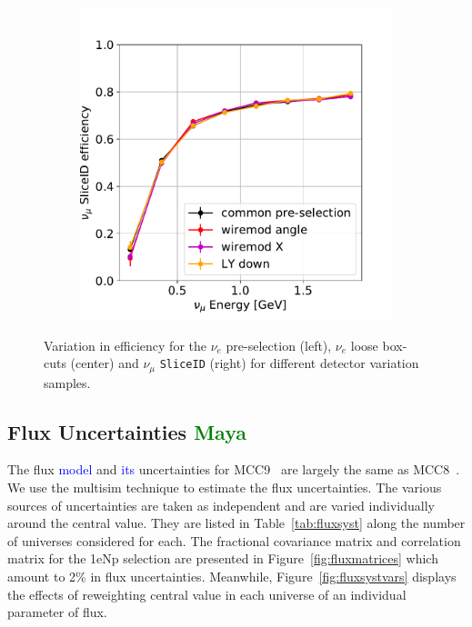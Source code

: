 \documentclass[a4paper]{article}
\begin{document}
\begin{figure}[H]
\begin{center}
\begin{subfigure}[b]{0.3\textwidth}
    \end{subfigure}
    \begin{subfigure}[b]{0.3\textwidth}
    \centering
    \includegraphics[width=1.00\textwidth]{detsys/nu_e01162020_numu_slice_eff.pdf}
    \end{subfigure}
\caption{\label{fig:detsys:dedx:eLEElow}Variation in efficiency for the $\nu_e$ pre-selection (left), $\nu_e$ loose box-cuts (center) and $\nu_{\mu}$ \texttt{SliceID} (right) for different detector variation samples.}
\end{center}
\end{figure}

\subsection{Flux Uncertainties \textcolor{green}{Maya}}
The flux \textcolor{blue}{model} and \textcolor{blue}{its} uncertainties for MCC9~\cite{bib:fluxmcc9,bib:fluxtechnote} are largely the same as MCC8~\cite{bib:fluxtechnote}. We use the multisim technique to estimate the flux uncertainties. The various sources of uncertainties are taken as independent and are varied individually around the central value. They are listed in Table~\ref{tab:fluxsyst} along the number of universes considered for each. The fractional covariance matrix and correlation matrix for the 1eNp selection are presented in Figure~\ref{fig:fluxmatrices} which amount to 2\% in flux uncertainties. Meanwhile, Figure~\ref{fig:fluxsystvars} displays the effects of reweighting central value in each universe of an individual parameter of flux.
\end{document}
